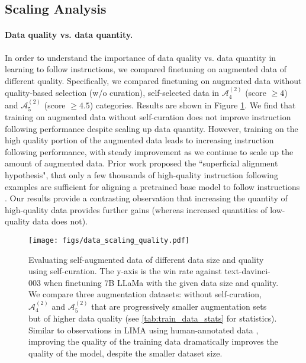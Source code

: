 \subsection{Scaling Analysis} \label{sec:scaling_analysis}
\paragraph{Data quality vs. data quantity.} In order to understand the importance of data quality vs. data quantity in learning to follow instructions, we compared finetuning on augmented data of different quality. Specifically, we compared finetuning on augmented data without quality-based selection (w/o curation), self-selected data in $\mathcal{A}_{4}^{(2)}$ (score $\geq 4$) and $\mathcal{A}_{5}^{(2)}$ (score $\geq 4.5$) categories. Results are shown  in Figure \ref{fig:data_quality_scaling}. We find that training on augmented data without self-curation does not improve instruction following performance despite scaling up data quantity. However,  training on the high quality portion of the augmented data leads to increasing instruction following performance, with steady improvement as we continue to scale up the amount of augmented data. Prior work proposed the ``superficial alignment hypothesis", that only a few thousands of high-quality instruction following examples are sufficient for aligning a pretrained base model to follow instructions \cite{zhou2023lima}. Our results provide a contrasting observation that increasing the quantity of high-quality data provides  further gains (whereas increased quantities of low-quality data does not). 

\begin{figure}
  \centering
  \texttt{[image: figs/data\_scaling\_quality.pdf]}
  \caption{Evaluating self-augmented data of different data size and quality using self-curation. The y-axis is the win rate against text-davinci-003 when finetuning 7B LLaMa with the given data size and quality. We compare three augmentation datasets:  without self-curation,  $\mathcal{A}_{4}^{(2)}$ and  $\mathcal{A}_{5}^{(2)}$ that are progressively smaller augmentation sets but of higher data quality 
  (see \autoref{tab:train_data_stats}
  for statistics).
  Similar to observations in LIMA using human-annotated data \citep{zhou2023lima}, improving the quality of the training data dramatically improves the quality of the model, despite the smaller dataset size. }
  \label{fig:data_quality_scaling}
\end{figure}

